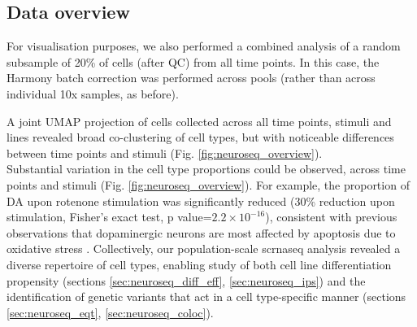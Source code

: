 


\newpage

\subsection{Data overview}

For visualisation purposes, we also performed a combined analysis of a random subsample of 20\% of cells (after QC) from all time points.
In this case, the Harmony batch correction was performed across pools (rather than across individual 10x samples, as before).

A joint UMAP projection of cells collected across all time points, stimuli and lines revealed broad co-clustering of cell types, but with noticeable differences between time points and stimuli (Fig. \ref{fig:neuroseq_overview}). \\

Substantial variation in the cell type proportions could be observed, across time points and stimuli (Fig. \ref{fig:neuroseq_overview}). 
For example, the proportion of DA upon rotenone stimulation was significantly reduced (30\% reduction upon stimulation, Fisher’s exact test, p value=$2.2 \times 10^{-16}$), consistent with previous observations that dopaminergic neurons are most affected by apoptosis due to oxidative stress \cite{sherer2003mechanism, knonagel1992autologous, cannon2009highly}.
Collectively, our population-scale \gls{scrnaseq} analysis revealed a diverse repertoire of cell types, enabling study of both cell line differentiation propensity (sections \ref{sec:neuroseq_diff_eff}, \ref{sec:neuroseq_ips}) and the identification of genetic variants that act in a cell type-specific manner (sections \ref{sec:neuroseq_eqt}, \ref{sec:neuroseq_coloc}). 
\\ 

